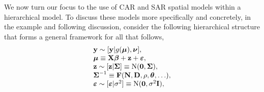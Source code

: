 \documentclass[11pt, titlepage]{article}\usepackage[]{graphicx}\usepackage[]{color}
\begin{document}
\begin{spacing}{1.9}
\begin{flushleft}
We now turn our focus to the use of CAR and SAR spatial models within a hierarchical model. To discuss these models more specifically and concretely, in the example and following discussion, consider the following hierarchical structure that forms a general framework for all that follows,
\begin{equation} \label{eq:HMsetup}
  \begin{array} {l}
    \mathbf{y} \sim [\mathbf{y}|g(\mbox{\boldmath $\mu$}),\mbox{\boldmath $\nu$}], \\
    \mbox{\boldmath $\mu$} \equiv \mathbf{X} \mbox{\boldmath $\beta$} + \mathbf{z}  + \mbox{\boldmath $\varepsilon$}, \\
		\mathbf{z} \sim \textrm{$[\mathbf{z}|\mbox{\boldmath $\Sigma$}]$} \equiv \textrm{N}(\mathbf{0},\mbox{\boldmath $\Sigma$}), \\
    \mbox{\boldmath $\Sigma$}^{-1} \equiv \mathbf{F}(\mathbf{N}, \mathbf{D},\rho,\mbox{\boldmath $\theta$},\ldots), \\
		\mbox{\boldmath $\varepsilon$} \sim \textrm{$[\mbox{\boldmath $\varepsilon$}|\sigma^2]$} \equiv \textrm{N}(\mathbf{0},\sigma^2\mathbf{I}), 
  \end{array}
\end{equation}

\end{flushleft}
\end{spacing}
\end{document}
